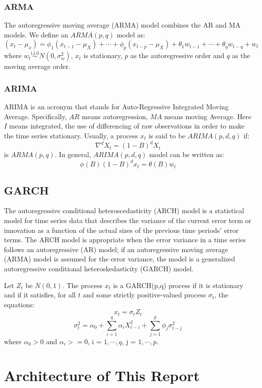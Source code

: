 \subsubsection{ARMA}
The autoregressive moving average (ARMA) model combines the AR and MA models. We define an $ARMA(p, q)$ model as:
$$ (x_t - \mu_x) = \phi_1 (x_{t-1} - \mu_X)  + \cdots + \phi_p (x_{t-p} - \mu_X) +  \theta_1 w_{t-1}  + \cdots + \theta_q w_{t-q} + w_t$$
where $w_t \overset{\text{i.i.d}}{\sim} N(0, \sigma_w^2)$, $x_t$ is stationary, $p$ as the autoregressive
order and $q$ as the moving average order. 

\subsubsection{ARIMA}
ARIMA is an acronym that stands for Auto-Regressive Integrated Moving Average. Specifically, $AR$ means autoregression, $MA$ means moving Average. Here $I$ means integrated, the use of differencing of raw observations in
order to make the time series stationary. Usually, a process $x_t$ is said to be $ARIMA(p, d, q)$ if:
$$ \nabla^d X_t  = (1-B)^d X_t$$
is $ARMA(p,q)$. In general, $ARIMA(p, d, q)$ model can be written as:
$$ \phi (B)(1-B)^d x_t = \theta(B) w_t $$

\subsection{GARCH}
The autoregressive conditional heteroscedasticity (ARCH) model is a statistical model for time series data that describes the variance of the current error term or innovation as a function of the actual sizes of the previous time periods' error terms. The ARCH model is appropriate when the error variance in a time series follows an autoregressive (AR) model; if an autoregressive moving average (ARMA) model is assumed for the error variance, the model is a generalized autoregressive conditional heteroskedasticity (GARCH) model.

Let $Z_t$ be $N(0,1)$. The process $x_t$ is a GARCH(p,q) process if it is stationary and if it satisfies, for all $t$ and some strictly positive-valued process $\sigma_t$, the equations:
$$ x_t  = \sigma_t Z_t$$
$$ \sigma_t^2 = \alpha_0 + \sum_{i = 1}^{q} \alpha_i X_{t-i}^2 + \sum_{j = 1}^{p} \phi_j \sigma_{t-j}^2 $$
where $\alpha_0 > 0$ and $\alpha_i >= 0$, i = $1,\cdots,q$, j = $1,\cdots,p$.

\section{Architecture of This Report}

